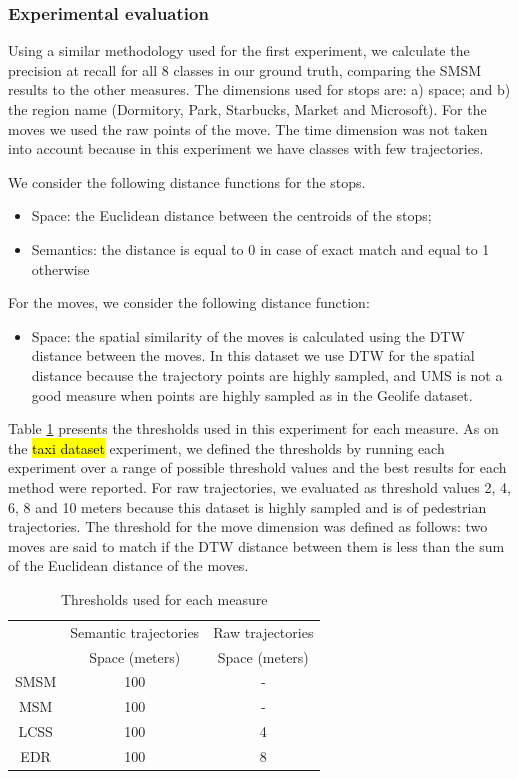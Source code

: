 \documentclass[12pt]{article}
\begin{document}
\subsubsection{Experimental evaluation}

Using a similar methodology used for the first experiment, we calculate the precision at recall for all 8 classes in our ground truth, comparing the SMSM results to the other measures. The dimensions used for stops are: a) space; and b) the region name (Dormitory, Park, Starbucks, Market and Microsoft). For the moves we used the raw points of the move. The time dimension was not taken into account because in this experiment we have classes with few trajectories.

We consider the following distance functions for the stops.
\begin{itemize}
  \item Space: the Euclidean distance between the centroids of the stops;
  \item Semantics: the distance is equal to 0 in case of exact match and equal to 1 otherwise
\end{itemize}

For the moves, we consider the following distance function:
\begin{itemize}
  \item Space: the spatial similarity of the moves is calculated using the DTW distance between the moves. In this dataset we use DTW for the spatial distance because the trajectory points are highly sampled, and UMS is not a good measure when points are highly sampled as in the Geolife dataset.
\end{itemize}

Table \ref{tab:geolife_thresholds} presents the thresholds used in this experiment for each measure. As on the \hl{taxi dataset} experiment, we defined the thresholds by running each experiment over a range of possible threshold values and the best results for each method were reported. For raw trajectories, we evaluated as threshold values 2, 4, 6, 8 and 10 meters because this dataset is highly sampled and is of pedestrian trajectories. The threshold for the move dimension was defined as follows: two moves are said to match if the DTW distance between them is less than the sum of the Euclidean distance of the moves.

\begin{table}[!h]
\scriptsize
  \centering
  \begin{tabular}{|c|c|c|}
  	\hline
  & \multicolumn{1}{c|}{Semantic trajectories} & \multicolumn{1}{c|}{Raw trajectories} \\
 	\cline{2-3}
  & Space (meters) & Space (meters) \\
  	\hline
 SMSM & 100 & - \\
 MSM & 100 & - \\
 LCSS & 100 & 4 \\
 EDR & 100 & 8 \\
    \hline
  \end{tabular}
  \caption{Thresholds used for each measure}
  \label{tab:geolife_thresholds}
\end{table}
\end{document}
